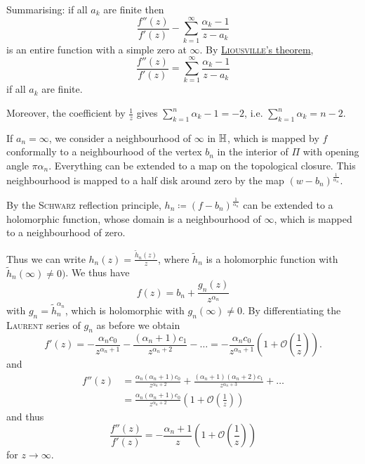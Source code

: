 \documentclass[a4paper,english]{article}
\begin{document}
\begin{pr}
    Summarising: if all $a_k$ are finite then
    \begin{equation*}
        \frac{f''(z)}{f'(z)} - \sum_{k = 1}^{\infty} \frac{\alpha_k - 1}{z - a_k}
    \end{equation*}
    is an entire function with a simple zero at $\infty$.
    By \hyperref[th:Liouville]{\textsc{Liousville}'s theorem}, 
    \begin{equation*}
        \frac{f''(z)}{f'(z)}
        = \sum_{k = 1}^{\infty} \frac{\alpha_k - 1}{z - a_k}
    \end{equation*}
    if all $a_k$ are finite.
    
    Moreover, the coefficient by $\frac{1}{z}$ gives $\sum_{k = 1}^{n} \alpha_k - 1 = - 2$, i.e. $\sum_{k = 1}^{n} \alpha_k = n - 2$.
    
    If $a_n = \infty$, we consider a neighbourhood of $\infty$ in $\mathbb{H}$, which is mapped by $f$ conformally to a neighbourhood of the vertex $b_n$ in the interior of $\Pi$ with opening angle $\pi \alpha_n$. 
    Everything can be extended to a map on the topological closure.
    This neighbourhood is mapped to a half disk around zero by the map $(w - b_n)^{\frac{1}{\alpha_n}}$.
    
    By the \textsc{Schwarz} reflection principle, $h_n \coloneqq (f - b_n)^{\frac{1}{\alpha_n}}$ can be extended to a holomorphic function, whose domain is a neighbourhood of $\infty$, which is mapped to a neighbourhood of zero.
    
    Thus we can write $h_n(z) = \frac{\tilde{h}_n(z)}{z}$, where $\tilde{h}_n$ is a holomorphic function with $\tilde{h}_n(\infty) \ne 0)$.
    We thus have
    \begin{equation*}
        f(z)
        = b_n + \frac{g_n(z)}{z^{\alpha_n}}
    \end{equation*}
    with $g_n = \tilde{h}_n^{\alpha_n}$, which is holomorphic with $g_n(\infty) \ne 0$.
    By differentiating the \textsc{Laurent} series of $g_n$ as before we obtain
    \begin{equation*}
        f'(z)
        = - \frac{\alpha_n c_0}{z^{\alpha_n + 1}} - \frac{(\alpha_n + 1) c_1}{z^{\alpha_n + 2}} - \ldots 
        = - \frac{\alpha_n c_0}{z^{\alpha_n + 1}}\left(1 + \mathcal{O}\left(\frac{1}{z}\right)\right).
    \end{equation*}
    and
    \begin{align*}
        f''(z)
        & = \frac{\alpha_n (\alpha_n + 1) c_0}{z^{\alpha_n + 2}}
        + \frac{(\alpha_n + 1)(\alpha_n + 2) c_1}{z^{\alpha_n + 3}} + \ldots \\
        & = \frac{\alpha_n (\alpha_n + 1) c_0}{z^{\alpha_n + 2}}\left(1 + \mathcal{O}\left(\frac{1}{z}\right)\right)
    \end{align*}
    and thus
    \begin{equation*}
        \frac{f''(z)}{f'(z)}
        = - \frac{\alpha_n + 1}{z} \left(1 + \mathcal{O}\left(\frac{1}{z}\right)\right)
    \end{equation*}
    for $z \to \infty$.
    

\end{pr}
\end{document}
